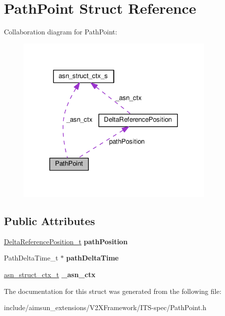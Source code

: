\hypertarget{structPathPoint}{}\section{Path\+Point Struct Reference}
\label{structPathPoint}


Collaboration diagram for Path\+Point\+:\nopagebreak
\begin{figure}[H]
\begin{center}
\leavevmode
\includegraphics[width=275pt]{structPathPoint__coll__graph}
\end{center}
\end{figure}
\subsection*{Public Attributes}
\begin{DoxyCompactItemize}
\item 
\hyperlink{structDeltaReferencePosition}{Delta\+Reference\+Position\+\_\+t} {\bfseries path\+Position}\hypertarget{structPathPoint_af78ca24d925981ff294a4601a4d3712a}{}\label{structPathPoint_af78ca24d925981ff294a4601a4d3712a}

\item 
Path\+Delta\+Time\+\_\+t $\ast$ {\bfseries path\+Delta\+Time}\hypertarget{structPathPoint_a0a65fa273b23114092a77318c97875a4}{}\label{structPathPoint_a0a65fa273b23114092a77318c97875a4}

\item 
\hyperlink{structasn__struct__ctx__s}{asn\+\_\+struct\+\_\+ctx\+\_\+t} {\bfseries \+\_\+asn\+\_\+ctx}\hypertarget{structPathPoint_a853f48bc8c0c1c145da65e56179dbb67}{}\label{structPathPoint_a853f48bc8c0c1c145da65e56179dbb67}

\end{DoxyCompactItemize}


The documentation for this struct was generated from the following file\+:\begin{DoxyCompactItemize}
\item 
include/aimsun\+\_\+extensions/\+V2\+X\+Framework/\+I\+T\+S-\/spec/Path\+Point.\+h\end{DoxyCompactItemize}
